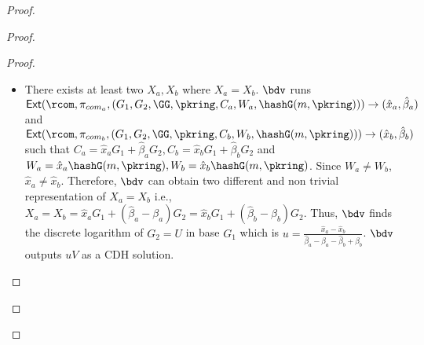 \begin{proof}
\begin{proof}
\begin{proof}
\begin{itemize}
				
				\item There exists at least two $ X_a,X_b $ where $ X_a = X_b $. $ \bdv $ runs $ \mathsf{Ext}(\rcom,\pi_{com_a},(G_1,G_2, \GG,\pkring, C_a,W_a,\hashG(m,\pkring))) \rightarrow (\hat{x}_a,\hat{\beta}_a )$ and $ \mathsf{Ext}(\rcom,\pi_{com_b},(G_1,G_2, \GG,\pkring, C_b,W_b,\hashG(m,\pkring))) \rightarrow (\hat{x}_b,\hat{\beta}_b )$ such that $ C_a = \hat{x}_aG_1 + \hat{\beta}_a G_2, C_b = \hat{x}_bG_1 + \hat{\beta}_b G_2 $ and $ W_a = \hat{x}_a \hashG(m,\pkring), W_b = \hat{x}_b \hashG(m,\pkring) $. Since $ W_a \neq W_b $, $ \hat{x}_a \neq \hat{x}_b $.  Therefore, $ \bdv $ can obtain  two different and non trivial representation of $ X_a = X_b $ i.e., $ X_a = X_b = \hat{x}_aG_1 + (\hat{\beta}_a - \beta_a) G_2 = \hat{x}_bG_1 + (\hat{\beta}_b - \beta_b) G_2  $. Thus, $ \bdv $ finds the discrete logarithm of $ G_2 = U $ in base $ G_1 $ which is $ u = \frac{\hat{x}_a - \hat{x}_b}{\hat{\beta}_a -\beta_a -\hat{\beta}_b + \beta_b} $. $ \bdv $ outputs $ uV $ as a CDH solution.
			\end{itemize}
			
			
			
			
			
			
			
			
			
			
			
			
			

\end{proof}
\end{proof}
\end{proof}
